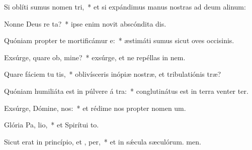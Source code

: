 \item Si oblíti sumus nomen  tri,~* et si expándimus manus nostras ad deum alinum:
\item Nonne Deus re ta?~* ipse enim novit abscóndita dis.
\item Quóniam propter te mortificámur  e:~* æstimáti sumus sicut oves occisinis.
\item Exsúrge, quare ob, mine?~* exsúrge, et ne repéllas in nem.
\item Quare fáciem tu tis,~* oblivísceris inópiæ nostræ, et tribulatiónis træ?
\item Quóniam humiliáta est in púlvere á tra:~* conglutinátus est in terra venter ter.
\item Exsúrge, Dómine,  nos:~* et rédime nos propter nomen um.
\item Glória Pa,  lio,~* et Spirítui to.
\item Sicut erat in princípio, et ,  per,~* et in sǽcula sæculórum. men.
